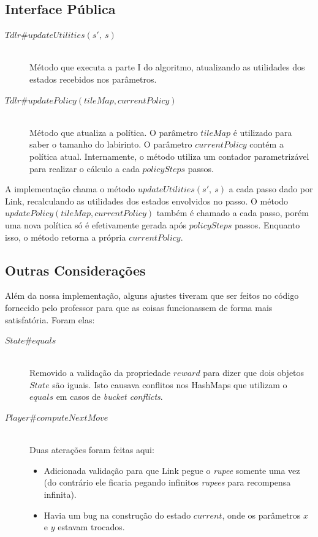 \documentclass[letterpaper]{article}
\begin{document}
\subsection{Interface Pública}

\begin{description}
\item[$Tdlr\#updateUtilities(s\prime,\ s)$] \hfill\\
  Método que executa a parte I do algoritmo, atualizando as utilidades dos estados recebidos
  nos parâmetros.
\item[$Tdlr\#updatePolicy(tileMap, currentPolicy)$] \hfill\\
  Método que atualiza a política. O parâmetro $tileMap$ é utilizado para saber o tamanho do
  labirinto. O parâmetro $currentPolicy$ contém a política atual. Internamente, o método utiliza
  um contador parametrizável para realizar o cálculo a cada $policySteps$ passos.
\end{description}

A implementação chama o método $updateUtilities(s\prime,\ s)$ a cada passo dado por Link,
recalculando as utilidades dos estados envolvidos no passo. O método
$updatePolicy(tileMap, currentPolicy)$ também é chamado a cada passo, porém uma nova política
só é efetivamente gerada após $policySteps$ passos. Enquanto isso, o método retorna a própria
$currentPolicy$.

\subsection{Outras Considerações}

Além da nossa implementação, alguns ajustes tiveram que ser feitos no código fornecido pelo
professor para que as coisas funcionassem de forma mais satisfatória. Foram elas:

\begin{description}
\item[$State\#equals$] \hfill \\Removido a validação da propriedade $reward$ para dizer que dois objetos $State$ são iguais. Isto causava conflitos nos HashMaps que utilizam o $equals$ em casos de \textit{bucket conflicts}.
\item[$Player\#computeNextMove$] \hfill \\ Duas aterações foram feitas aqui:
  \begin{itemize}
  \item Adicionada validação para que Link pegue o \textit{rupee} somente uma vez (do contrário ele ficaria pegando infinitos \textit{rupees} para recompensa infinita).
  \item Havia um bug na construção do estado $current$, onde os parâmetros $x$ e $y$ estavam trocados.
  \end{itemize}
\end{description}
\end{document}
